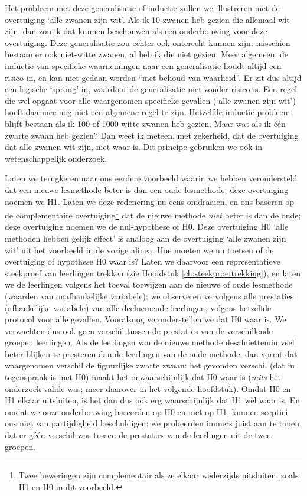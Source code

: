 \documentclass[
]{book}
\begin{document}
Het probleem met deze generalisatie of inductie zullen we illustreren
met de overtuiging `alle zwanen zijn wit'. Als ik 10 zwanen heb gezien
die allemaal wit zijn, dan zou ik dat kunnen beschouwen als een
onderbouwing voor deze overtuiging. Deze generalisatie zou echter ook
onterecht kunnen zijn: misschien bestaan er ook niet-witte zwanen, al
heb ik die niet gezien. Meer algemeen: de inductie van specifieke
waarnemingen naar een generalisatie houdt altijd een risico in, en kan
niet gedaan worden ``met behoud van waarheid''. Er zit dus altijd een
logische `sprong' in, waardoor de generalisatie niet zonder risico is.
Een regel die wel opgaat voor alle waargenomen specifieke gevallen
(`alle zwanen zijn wit') hoeft daarmee nog niet een algemene regel te
zijn. Hetzelfde inductie-probleem blijft bestaan als ik 100 of 1000
witte zwanen heb gezien. Maar wat als ik één zwarte zwaan heb gezien?
Dan weet ik meteen, met zekerheid, dat de overtuiging dat alle zwanen
wit zijn, niet waar is. Dit principe gebruiken we ook in
wetenschappelijk onderzoek.

Laten we terugkeren naar ons eerdere voorbeeld waarin we hebben
verondersteld dat een nieuwe lesmethode beter is dan een oude
lesmethode; deze overtuiging noemen we H1. Laten we deze redenering nu
eens omdraaien, en ons baseren op de complementaire overtuiging\footnote{Twee beweringen zijn complementair als ze elkaar wederzijds uitsluiten, zoals H1 en H0 in dit voorbeeld.} dat
de nieuwe methode \emph{niet} beter is dan de oude; deze overtuiging noemen
we de nul-hypothese of H0. Deze overtuiging H0 `alle methoden hebben
gelijk effect' is analoog aan de overtuiging `alle zwanen zijn wit' uit
het voorbeeld in de vorige alinea. Hoe moeten we nu toetsen of de
overtuiging of hypothese H0 waar is? Laten we daarvoor een
representatieve steekproef van leerlingen trekken (zie
Hoofdstuk \ref{ch:steekproeftrekking}), en laten we de leerlingen volgens
het toeval toewijzen aan de nieuwe of oude lesmethode (waarden van
onafhankelijke variabele); we observeren vervolgens alle prestaties
(afhankelijke variabele) van alle deelnemende leerlingen, volgens
hetzelfde protocol voor alle gevallen. Vooralsnog veronderstellen we dat
H0 waar is. We verwachten dus ook geen verschil tussen de prestaties van
de verschillende groepen leerlingen. Als de leerlingen van de nieuwe
methode desalniettemin veel beter blijken te presteren dan de leerlingen
van de oude methode, dan vormt dat waargenomen verschil de figuurlijke
zwarte zwaan: het gevonden verschil (dat in tegenspraak is met H0) maakt
het onwaarschijnlijk dat H0 waar is (\emph{mits} het onderzoek valide was;
meer daarover in het volgende hoofdstuk). Omdat H0 en H1 elkaar
uitsluiten, is het dan dus ook erg waarschijnlijk dat H1 wèl waar is. En
omdat we onze onderbouwing baseerden op H0 en niet op H1, kunnen
sceptici ons niet van partijdigheid beschuldigen: we probeerden immers
juist aan te tonen dat er géén verschil was tussen de prestaties van de
leerlingen uit de twee groepen.
\end{document}
